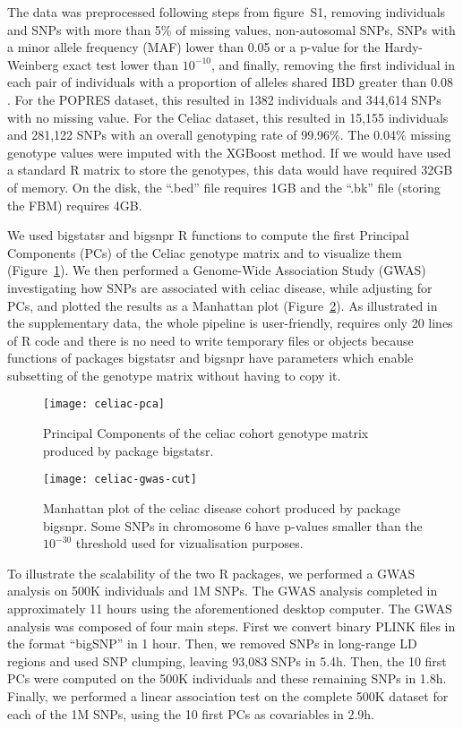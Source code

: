 \documentclass{bioinfo}
\begin{document}
The data was preprocessed following steps from figure~S1, removing individuals and SNPs with more than 5\% of missing values, non-autosomal SNPs, SNPs with a minor allele frequency (MAF) lower than 0.05 or a p-value for the Hardy-Weinberg exact test lower than $10^{-10}$, and finally, removing the first individual in each pair of individuals with a proportion of alleles shared IBD greater than 0.08 \cite[]{Purcell2007}. 
For the POPRES dataset, this resulted in 1382 individuals and 344,614 SNPs with no missing value.
For the Celiac dataset, this resulted in 15,155 individuals and 281,122 SNPs with an overall genotyping rate of 99.96\%. The 0.04\% missing genotype values were imputed with the XGBoost method. If we would have used a standard R matrix to store the genotypes, this data would have required 32GB of memory. On the disk, the ``.bed'' file requires 1GB and the ``.bk'' file (storing the FBM) requires 4GB. 

We used bigstatsr and bigsnpr R functions to compute the first Principal Components (PCs) of the Celiac genotype matrix and to visualize them (Figure~\ref{fig:pca}). We then performed a Genome-Wide Association Study (GWAS) investigating how SNPs are associated with celiac disease, while adjusting for PCs, and plotted the results as a Manhattan plot (Figure~\ref{fig:gwas}). As illustrated in the supplementary data, the whole pipeline is user-friendly, requires only 20 lines of R code and there is no need to write temporary files or objects because functions of packages bigstatsr and bigsnpr have parameters which enable subsetting of the genotype matrix without having to copy it. 

\begin{figure}[!tpb]
\centerline{\texttt{[image: celiac-pca]}}
\caption{Principal Components of the celiac cohort genotype matrix produced by package bigstatsr.}\label{fig:pca}
\end{figure}

\begin{figure}[!tpb]
\centerline{\texttt{[image: celiac-gwas-cut]}}
\caption{Manhattan plot of the celiac disease cohort produced by package bigsnpr. Some SNPs in chromosome 6 have p-values smaller than the $10^{-30}$ threshold used for vizualisation purposes.}\label{fig:gwas}
\end{figure}

To illustrate the scalability of the two R packages, we performed a GWAS analysis on 500K individuals and 1M SNPs. The GWAS analysis completed in approximately 11 hours using the aforementioned desktop computer. The GWAS analysis was composed of four main steps. 
First we convert binary PLINK files in the format ``bigSNP'' in 1 hour.
Then, we removed SNPs in long-range LD regions and used SNP clumping, leaving 93,083 SNPs in 5.4h. Then, the 10 first PCs were computed on the 500K individuals and these remaining SNPs in 1.8h. Finally, we performed a linear association test on the complete 500K dataset for each of the 1M SNPs, using the 10 first PCs as covariables in 2.9h.
\end{document}
